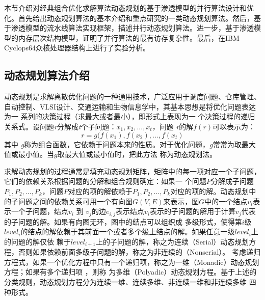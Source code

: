 \begin{flushleft}
本节介绍对经典组合优化求解算法动态规划的基于渗透模型的并行算法设计和优化。首先给出动态规划算法的基本介绍和重点研究的一类动态规划算法。然后，基于渗透模型的流水线算法实现框架，描述并行动态规划算法。进一步，基于渗透模型的内存层次结构模型，证明了并行算法的最有访存复杂性。最后，在IBM Cyclops64众核处理器结构上进行了实验分析。

\subsection{动态规划算法介绍}
动态规划是求解离散优化问题的一种通用技术，广泛应用于调度问题、仓库管理、自动控制、VLSI设计、交通运输和生物信息学中\citep{dp-book,parallelcomputing-book}，其基本思想是将优化问题表达为一
系列的决策过程（求最大或者最小），即形式上表现为一
个决策过程的递归关系式\citep{dp-principle}。设问题{\it r}分解成{\it t}个子问题：$x_{1}, x_{2}, ..., x_{t}$，问题{\it
	r}的解$f(r)$可以表示为：
\begin{equation}\label{op_eq}
r=g(f(x_{1}), f(x_{2}), ..., f(x_{t})
\end{equation}
其中{\it
	g}称为组合函数，它依赖于问题本来的性质。对于优化问题，$g$常常为取最大值或最小值。当$g$取最大值或最小值时，把此方法
称为动态规划法。

求解动态规划的过程通常是填充动态规划矩阵，矩阵中的每一项对应一个子问题，它们的依赖关系根据问题的分解和组合规则确定：如果一
个问题$P$分解成子问题$P_{1}, P_{2}, ..., P_{k}$，问题$P$对应的项的解依赖于$P_{1}, P_{2}, ...,
P_{k}$对应的项的解。动态规划中的子问题之间的依赖关系可用一个有向图$G(V, E)$来表示，图$G$中的一个结点$v_{i}$表示一个子问题，结点$v_{i}$
到
$v_{j}$的边$e_{i,j}$表示结点$v_{i}$表示的子问题的解用于计算$v_{j}$代表的子问题的解。如果有向图无环，图中的结点可以组织成
多级形式，使得第$i$级$level_{i}$的结点的解依赖于其前面一个或者多个级上结点的解。如果任意一级$level_{i}$上的问题的解仅依
赖于$level_{i+1}$上的子问题的解，称之为连续（Serial）动态规划方程，否则如果依赖前面多级子问题的解，称之为非连续的（Nonserial）。
考虑递归方程式，如果一个优化方程中只有一个递归项，称之为一维（Monadic）动态规划方程；如果有多个递归项
，则称 为多维（Polyadic）动态规划方程。基于上述的分类规则，动态规划方程分为连续一维、连续多维、非连续一维和非连续多维
四种形式\citep{parallelcomputing-book}。


\end{flushleft}
